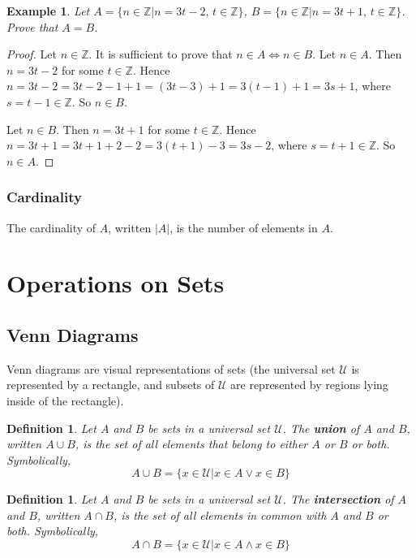 \documentclass[10pt,reqno]{book}
\theoremstyle{plain}
\newtheorem{definition}[theorem]{Definition}
\newtheorem{example}{Example}
\def\Z{\mathbb{Z}}
\def\U{\mathcal{U}}
\begin{document}
	\begin{example}
		Let $ A = \{n \in \Z | n =3t-2, \,t \in \Z \} $, $ B = \{ n \in \Z | n = 3t+1, \, t \in \Z \} $. Prove that $ A = B $.
	\end{example}
	
	\begin{proof}
		Let $ n \in \Z $. It is sufficient to prove that $ n \in A \Leftrightarrow n \in B $. Let $ n \in A $. Then $ n = 3t-2 $ for some $ t \in \Z $. Hence $ n = 3t-2 = 3t -2 -1 + 1 = (3t-3) + 1 = 3(t-1) + 1 = 3s+1 $, where $ s = t-1 \in \Z $. So $ n \in B $.
		
		\noindent Let $ n \in B $. Then $ n = 3t+1 $ for some $ t \in \Z $. Hence $ n = 3t+1 = 3t+1+2-2 = 3(t+1)-3 = 3s-2 $, where $ s = t+1 \in \Z $. So $ n \in A $.
	\end{proof}
	
	\subsubsection*{Cardinality}
	
	The cardinality of $ A $, written $ |A| $, is the number of elements in $ A $.	
	
	
	\section{Operations on Sets}
	
	\subsection*{Venn Diagrams}
	
	Venn diagrams are visual representations of sets (the universal set $ \U $ is represented by a rectangle, and subsets of $ \U $ are represented by regions lying inside of the rectangle).
	
	\begin{definition}
		Let $ A $ and $ B $ be sets in a universal set $ \U $. The \textbf{union} of $ A $ and $ B $, written $ A \cup B $, is the set of all elements that belong to either $ A $ or $ B $ or both. Symbolically,
		\[ A \cup B = \{ x \in \U | x \in A \vee x \in B \} \]
	\end{definition}

	\begin{definition}
		Let $ A $ and $ B $ be sets in a universal set $ \U $. The \textbf{intersection} of $ A $ and $ B $, written $ A \cap B $, is the set of all elements in common with $ A $ and $ B $ or both. Symbolically,
		\[ A \cap B = \{ x \in \U | x \in A \wedge x \in B \} \]
	\end{definition}	
	
\end{document}
